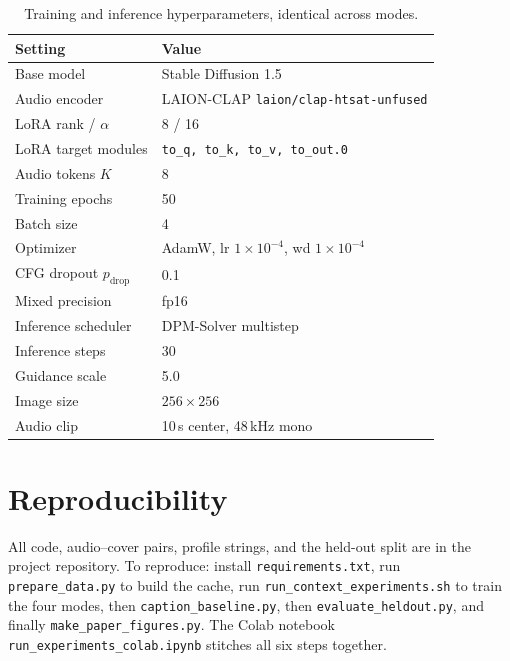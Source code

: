 \documentclass{article}
\begin{document}
\begin{table}[H]
\centering
\caption{Training and inference hyperparameters, identical across modes.}
\begin{tabular}{ll}
\toprule
Setting & Value \\
\midrule
Base model & Stable Diffusion 1.5 \\
Audio encoder & LAION-CLAP \texttt{laion/clap-htsat-unfused} \\
LoRA rank / $\alpha$ & 8 / 16 \\
LoRA target modules & \texttt{to\_q, to\_k, to\_v, to\_out.0} \\
Audio tokens $K$ & 8 \\
Training epochs & 50 \\
Batch size & 4 \\
Optimizer & AdamW, lr $1\!\times\!10^{-4}$, wd $1\!\times\!10^{-4}$ \\
CFG dropout $p_{\text{drop}}$ & 0.1 \\
Mixed precision & fp16 \\
Inference scheduler & DPM-Solver multistep \\
Inference steps & 30 \\
Guidance scale & 5.0 \\
Image size & $256\times 256$ \\
Audio clip & 10\,s center, 48\,kHz mono \\
\bottomrule
\end{tabular}
\end{table}

\section{Reproducibility}
\label{app:repro}
All code, audio--cover pairs, profile strings, and the held-out split are
in the project repository. To reproduce: install
\texttt{requirements.txt}, run \texttt{prepare\_data.py} to build the
cache, run \texttt{run\_context\_experiments.sh} to train the four
modes, then \texttt{caption\_baseline.py}, then
\texttt{evaluate\_heldout.py}, and finally
\texttt{make\_paper\_figures.py}. The Colab notebook
\texttt{run\_experiments\_colab.ipynb} stitches all six steps together.
\end{document}
